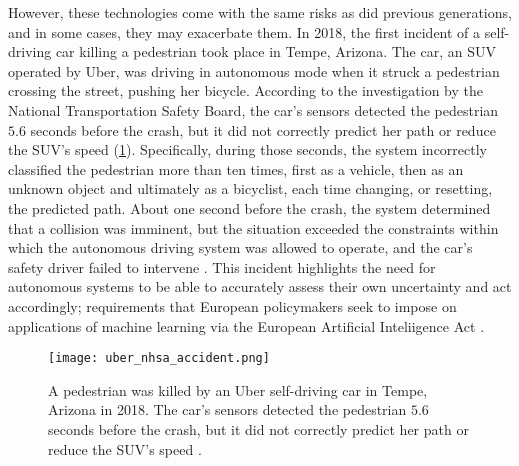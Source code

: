However, these technologies come with the same risks as did previous generations, and in some cases, they may exacerbate them.
In 2018, the first incident of a self-driving car killing a pedestrian took place in Tempe, Arizona. 
The car, an SUV operated by Uber, was driving in autonomous mode when it struck a pedestrian crossing the street, pushing her bicycle. 
According to the investigation by the National Transportation Safety Board, the car's sensors detected the pedestrian $5.6$ seconds before the crash, but it did not correctly predict her path or reduce the SUV's speed (\cref{fig:uber_nhsa_accident}). 
Specifically, during those seconds, the system incorrectly classified the pedestrian more than ten times, first as a vehicle, then as an unknown object and ultimately as a bicyclist, each time changing, or resetting, the predicted path. 
About one second before the crash, the system determined that a collision was imminent, but the situation exceeded the constraints within which the autonomous driving system was allowed to operate, and the car's safety driver failed to intervene \cite{nationaltransportationsafetyboardnhsa_collision_2019}. 
This incident highlights the need for autonomous systems to be able to accurately assess their own uncertainty and act accordingly; requirements that European policymakers seek to impose on applications of machine learning via the European Artificial Inteliigence Act \cite{europeancommission_briefing_2021}.

\begin{figure}
    \centering
    \texttt{[image: uber\_nhsa\_accident.png]}
    \caption{A pedestrian was killed by an Uber self-driving car in Tempe, Arizona in 2018. The car's sensors detected the pedestrian $5.6$ seconds before the crash, but it did not correctly predict her path or reduce the SUV's speed \cite{nationaltransportationsafetyboardnhsa_collision_2019}.}
    \label{fig:uber_nhsa_accident}
\end{figure}




